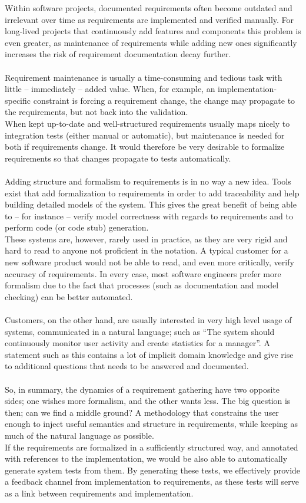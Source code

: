 Within software projects, documented requirements often become outdated and irrelevant over time as requirements are implemented and verified manually. For long-lived projects that continuously add features and components this problem is even greater, as maintenance of requirements while adding new ones significantly increases the risk of requirement documentation decay further.\\\\
Requirement maintenance is usually a time-consuming and tedious task with little -- immediately -- added value. When, for example, an implementation-specific constraint is forcing a requirement change, the change may propagate to the requirements, but not back into the validation.\\
When kept up-to-date and well-structured requirements usually maps nicely to integration tests (either manual or automatic), but maintenance is needed for both if requirements change. It would therefore be very desirable to formalize requirements so that changes propagate to tests automatically.\\\\
Adding structure and formalism to requirements is in no way a new idea. Tools exist that add formalization to requirements in order to add traceability and help building detailed models of the system. This gives the great benefit of being able to -- for instance -- verify model correctness with regards to requirements and to perform code (or code stub) generation.\\
These systems are, however, rarely used in practice, as they are very rigid and hard to read to anyone not proficient in the notation. A typical customer for a new software product would not be able to read, and even more critically, verify accuracy of requirements. In every case, most software engineers prefer more formalism due to the fact that processes (such as documentation and model checking) can be better automated.\\\\
Customers, on the other hand, are usually interested in very high level usage of systems, communicated in a natural language; such as ``The system should continuously monitor user activity and create statistics for a manager''. A statement such as this contains a lot of implicit domain knowledge and give rise to additional questions that needs to be answered and documented.\\\\
So, in summary, the dynamics of a requirement gathering have two opposite sides; one wishes more formalism, and the other wants less. The big question is then; can we find a middle ground? A methodology that constrains the user enough to inject useful semantics and structure in requirements, while keeping as much of the natural language as possible.\\
If the requirements are formalized in a sufficiently structured way, and annotated with references to the implementation, we would be also able to automatically generate system tests from them. By generating these tests, we effectively provide a feedback channel from implementation to requirements, as these tests will serve as a link between requirements and implementation.

